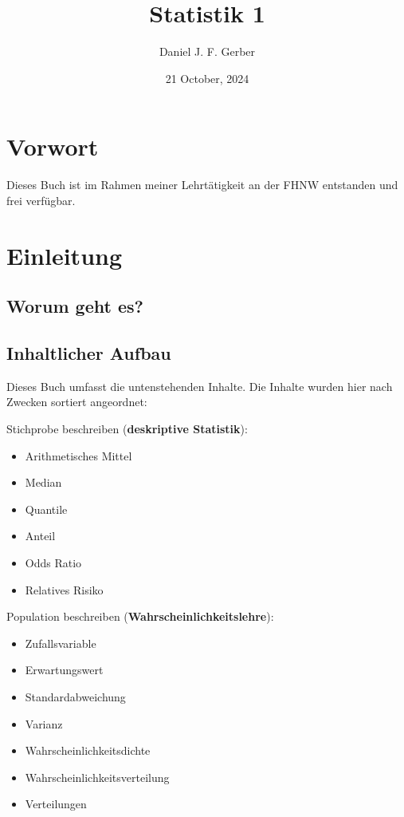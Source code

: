 \documentclass[
]{book}
\title{Statistik 1}
\author{Daniel J. F. Gerber}
\date{21 October, 2024}
\providecommand{\tightlist}{%
  \setlength{\itemsep}{0pt}\setlength{\parskip}{0pt}}
\theoremstyle{definition}
\theoremstyle{definition}
\theoremstyle{definition}
\theoremstyle{definition}
\theoremstyle{remark}
\begin{document}
\maketitle

{
\setcounter{tocdepth}{1}
\tableofcontents
}
\chapter*{Vorwort}\label{vorwort}

Dieses Buch ist im Rahmen meiner Lehrtätigkeit an der FHNW entstanden und frei verfügbar.

\chapter{Einleitung}\label{einleitung}

\section{Worum geht es?}\label{worum-geht-es}

\section{Inhaltlicher Aufbau}\label{inhaltlicher-aufbau}

Dieses Buch umfasst die untenstehenden Inhalte. Die Inhalte wurden hier nach Zwecken sortiert angeordnet:

Stichprobe beschreiben (\textbf{deskriptive Statistik}):

\begin{itemize}
\tightlist
\item
  Arithmetisches Mittel
\item
  Median
\item
  Quantile
\item
  Anteil
\item
  Odds Ratio
\item
  Relatives Risiko
\end{itemize}

Population beschreiben (\textbf{Wahrscheinlichkeitslehre}):

\begin{itemize}
\tightlist
\item
  Zufallsvariable
\item
  Erwartungswert
\item
  Standardabweichung
\item
  Varianz
\item
  Wahrscheinlichkeitsdichte
\item
  Wahrscheinlichkeitsverteilung
\item
  Verteilungen
\end{itemize}
\end{document}
